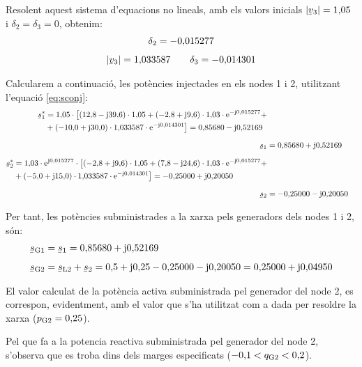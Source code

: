\begin{exemple}
Resolent aquest sistema d'equacions no lineals, amb els valors
inicials $|\cmplx{v}_3|=1{,}05$ i $\delta_2=\delta_3=0$, obtenim:
\begin{gather*}
   \delta_2=-0{,}015277 \\[1ex]
   |\cmplx{v}_3|=1{,}033587 \qquad \delta_3=-0{,}014301
\end{gather*}

Calcularem a continuaci\'{o}, les pot\`{e}ncies injectades en els nodes 1 i
2, utilitzant l'equaci\'{o} \eqref{eq:sconj}:
\begin{align*}
\begin{split}
\cmplx{s}_1^* &= 1{,}05 \cdot\bigl[ (12{,}8-\ju39{,}6) \cdot 1{,}05
+
(-2{,}8+\ju9{,}6) \cdot 1{,}03\cdot\eu^{-\ju0{,}015277} + \\
&+ (-10{,}0+\ju30{,}0) \cdot 1{,}033587\cdot\eu^{-\ju0{,}014301}
\bigr] = 0{,}85680 - \ju 0{,}52169
\end{split} \\[1.5ex]
\cmplx{s}_1 &= 0{,}85680 + \ju 0{,}52169 \\[1.5ex]
\begin{split}
\cmplx{s}_2^* &= 1{,}03 \cdot\eu^{\ju0{,}015277} \cdot\bigl[
(-2{,}8+\ju9{,}6) \cdot 1{,}05 +
 (7{,}8-\ju24{,}6) \cdot 1{,}03\cdot\eu^{-\ju0{,}015277} + \\
& + (-5{,}0+\ju15{,}0) \cdot 1{,}033587\cdot\eu^{-\ju0{,}014301}
\bigr] = -0{,}25000 + \ju 0{,}20050
\end{split} \\[1.5ex]
 \cmplx{s}_2 &= -0{,}25000 - \ju 0{,}20050
\end{align*}

Per tant, les pot\`{e}ncies subministrades a la xarxa pels generadors
dels nodes 1 i 2, s\'{o}n:
\begin{align*}
\cmplx{s}\ped{G1} &= \cmplx{s}_1 = 0{,}85680 + \ju 0{,}52169 \\[1ex]
\cmplx{s}\ped{G2} &= \cmplx{s}\ped{L2} + \cmplx{s}_2 = 0{,}5 + \ju
0{,}25 -0{,}25000 - \ju 0{,}20050  = 0{,}25000 + \ju 0{,}04950
\end{align*}

El valor calculat de la pot\`{e}ncia activa subministrada pel generador
del node 2, es
 correspon, evidentment, amb el valor que s'ha utilitzat com a dada per
resoldre la xarxa ($p_\mathrm{G2}=0{,}25$).

Pel que fa a la potencia reactiva subministrada pel generador del
node 2, s'observa que es troba dins dels  marges especificats
($-0{,}1<q_\mathrm{G2}<0{,}2$).
\end{exemple}

